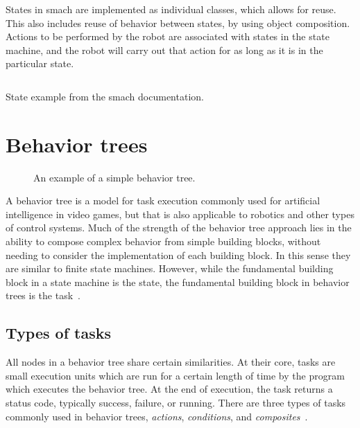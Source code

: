 \documentclass[\rootfolder/main.tex]{subfiles}
\begin{document}
States in \acrshort{smach} are implemented as individual classes, which allows for reuse.
This also includes reuse of behavior between states, by using object composition.
Actions to be performed by the robot are associated with states in the state machine, and the robot will carry out that action for as long as it is in the particular state.

\begin{listing}
\inputminted{python}{\rootfolder/Chapters/Chapter2/Listings/smachstate.py}
\caption{State example from the \acrshort{smach} documentation.}
\end{listing}


\section{Behavior trees}

\begin{wrapfigure}{L}{0.5\columnwidth}
    \caption{An example of a simple behavior tree.}
    \label{fig:behaviortree}
\end{wrapfigure}

A behavior tree is a model for task execution commonly used for artificial intelligence in video games, but that is also applicable to robotics and other types of control systems.
Much of the strength of the behavior tree approach lies in the ability to compose complex behavior from simple building blocks, without needing to consider the implementation of each building block.
In this sense they are similar to finite state machines.
However, while the fundamental building block in a state machine is the state, the fundamental building block in behavior trees is the task~\cite{Millington2009}.


\subsection{Types of tasks}

All nodes in a behavior tree share certain similarities.
At their core, tasks are small execution units which are run for a certain length of time by the program which executes the behavior tree.
At the end of execution, the task returns a status code, typically success, failure, or running.
There are three types of tasks commonly used in behavior trees, \emph{actions}, \emph{conditions}, and \emph{composites}~\cite{Millington2009}.
\end{document}
